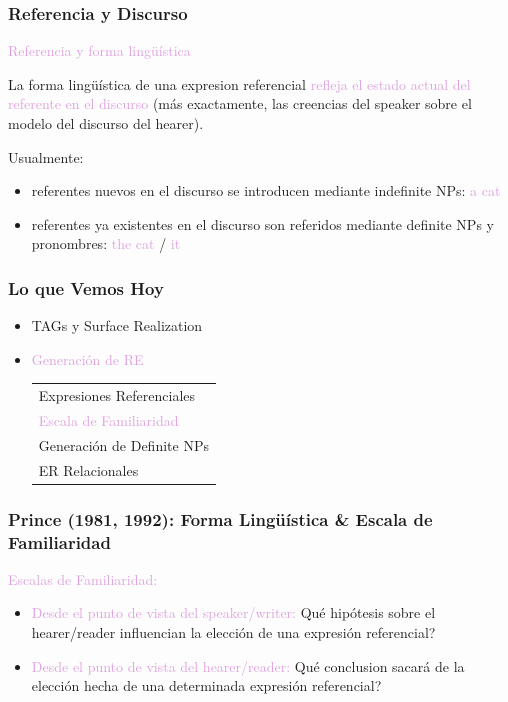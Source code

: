 \documentclass[compress,color=usenames]{beamer}
\newcommand{\mH}[1]{\textcolor{Plum}{#1}}
\begin{document}
\begin{frame}
\frametitle{Referencia y Discurso}

\mH{Referencia y forma ling\"u\'istica}
\medskip

La forma ling\"u\'istica de una expresion referencial \mH{refleja el
estado actual del referente en el discurso} (m\'as exactamente, 
las creencias del speaker sobre el modelo del discurso del hearer). 
\medskip
\pause

Usualmente:

\begin{itemize}
\item referentes nuevos en el discurso se introducen mediante indefinite NPs: \mH{a cat}

\item referentes ya existentes en el discurso son referidos mediante definite NPs y pronombres:
\mH{the cat} / \mH{it}
\end{itemize}
\end{frame}

\begin{frame}
\frametitle{Lo que Vemos Hoy}

\begin{itemize}
\item TAGs y Surface Realization
\item \mH{Generaci\'on de RE}
\begin{tabular}{|l}
Expresiones Referenciales\\
\mH{Escala de Familiaridad}\\
Generaci\'on de Definite NPs\\
ER Relacionales 
\end{tabular}
\end{itemize}
\end{frame}


\begin{frame}
\frametitle{Prince (1981, 1992): Forma Ling\"u\'istica  \& Escala de Familiaridad}

\mH{Escalas de Familiaridad:}
\medskip

\begin{itemize}
\item \mH{Desde el punto de vista del speaker/writer:}
Qu\'e hip\'otesis sobre el hearer/reader influencian la elecci\'on de una expresi\'on 
referencial?

\item \mH{Desde el punto de vista del hearer/reader:}
Qu\'e conclusion sacar\'a de la elecci\'on hecha de una determinada expresi\'on 
referencial?
\end{itemize}

\end{frame}
\end{document}
